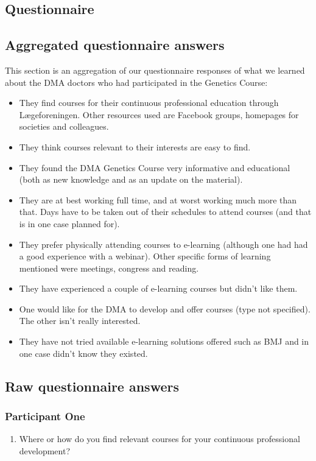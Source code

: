 \begin{appendices}
\chapter{Questionnaire}\label{appendix:questionnaire}

\section{Aggregated questionnaire answers}

This section is an aggregation of our questionnaire responses of what we learned about the DMA doctors who had participated in the Genetics Course:

\begin{itemize}
    \item They find courses for their continuous professional education through Lægeforeningen. Other resources used are Facebook groups, homepages for societies and colleagues.
    \item They think courses relevant to their interests are easy to find.
    \item They found the DMA Genetics Course very informative and educational (both as new knowledge and as an update on the material).
    \item They are at best working full time, and at worst working much more than that. Days have to be taken out of their schedules to attend courses (and that is in one case planned for).
    \item They prefer physically attending courses to e-learning (although one had had a good experience with a webinar). Other specific forms of learning mentioned were meetings, congress and reading.
    \item They have experienced a couple of e-learning courses but didn’t like them.
    \item One would like for the DMA to develop and offer courses (type not specified). The other isn’t really interested.
    \item They have not tried available e-learning solutions offered such as BMJ and in one case didn’t know they existed.
\end{itemize}

\section{Raw questionnaire answers}

\subsection{Participant One}
\begin{enumerate}
    \item Where or how do you find relevant courses for your continuous professional development?


\end{enumerate}
\end{appendices}
